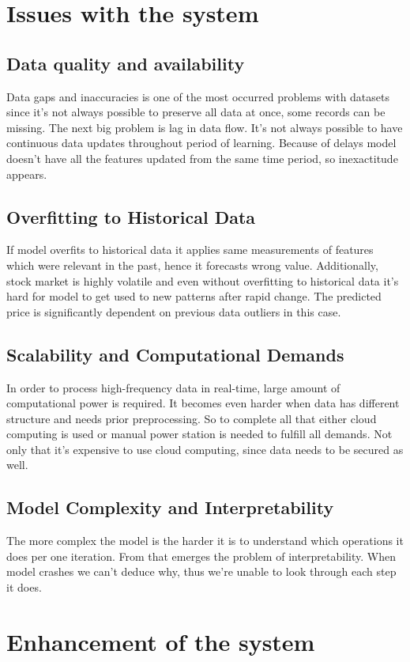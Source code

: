 \documentclass[10pt,twoside,english,a4paper]{article}
\begin{document}
\section{Issues with the system}
\subsection{Data quality and availability}
Data gaps and inaccuracies is one of the most occurred problems with datasets since it's not always possible to preserve all data at once, some records can be missing. The next big problem is lag in data flow. It's not always possible to have continuous data updates throughout period of learning. Because of delays model doesn't have all the features updated from the same time period, so inexactitude appears.\cite{quality}
\subsection{Overfitting to Historical Data}
If model overfits to historical data it applies same measurements of features which were relevant in the past, hence it forecasts wrong value. Additionally, stock market is highly volatile and even without overfitting to historical data it's hard for model to get used to new patterns after rapid change. The predicted price is significantly dependent on previous data outliers in this case.\cite{overfit}
\subsection{Scalability and Computational Demands}
In order to process high-frequency data in real-time, large amount of computational power is required. It becomes even harder when data has different structure and needs prior preprocessing. So to complete all that either cloud computing is used or manual power station is needed to fulfill all demands. Not only that it's expensive to use cloud computing, since data needs to be secured as well.\cite{scalability}
\subsection{Model Complexity and Interpretability}
The more complex the model is the harder it is to understand which operations it does per one iteration. From that emerges the problem of interpretability. When model crashes we can't deduce why, thus we're unable to look through each step it does.\cite{complexity}
 
\section{Enhancement of the system}
\end{document}
